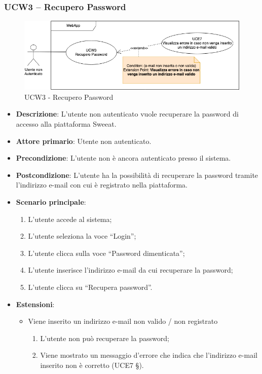 \subsubsection{UCW3 – Recupero Password}
\begin{figure}[!h]
\centering
\includegraphics[scale=0.5]{UC_images/UCW3.png}
\caption{UCW3 - Recupero Password}
\end{figure}
\begin{itemize}
\item \textbf{Descrizione}: L'utente non autenticato vuole recuperare la password di accesso alla piattaforma Sweeat.
\item \textbf{Attore primario}: Utente non autenticato.
\item \textbf{Precondizione}: L’utente non è ancora autenticato presso il sistema.
\item \textbf{Postcondizione}: L’utente ha la possibilità di recuperare la password tramite l'indirizzo e-mail con cui è registrato nella piattaforma.

\item \textbf{Scenario principale}:
\begin{enumerate}
\item L’utente accede al sistema;
\item L’utente seleziona la voce “Login”;
\item L’utente clicca sulla voce “Password dimenticata”;
\item L’utente inserisce l’indirizzo e-mail da cui recuperare la password;
\item L’utente clicca su “Recupera password”. 
\end{enumerate}

\item \textbf{Estensioni}:
\begin{itemize}
\item Viene inserito un indirizzo e-mail non valido / non registrato
\begin{enumerate}
	\item L’utente non può recuperare la password;
	\item Viene mostrato un messaggio d’errore che indica che l’indirizzo e-mail inserito non è corretto (UCE7 §).
\end{enumerate}
\end{itemize}
\end{itemize}

\pagebreak